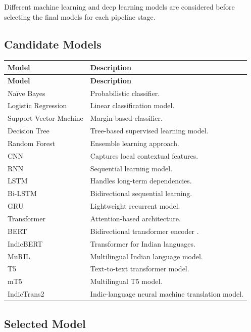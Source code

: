 Different machine learning and deep learning models are considered before selecting the final models for each pipeline stage.

\subsection{Candidate Models}

\begin{longtable}{|p{5cm}|p{8cm}|}
\hline
\textbf{Model} & \textbf{Description} \\
\hline
\endfirsthead
\hline
\textbf{Model} & \textbf{Description} \\
\hline
\endhead
Na\"ive Bayes & Probabilistic classifier.\\
\hline
Logistic Regression & Linear classification model.\\
\hline
Support Vector Machine & Margin-based classifier.\\
\hline
Decision Tree & Tree-based supervised learning model.\\
\hline
Random Forest & Ensemble learning approach.\\
\hline
CNN & Captures local contextual features.\\
\hline
RNN & Sequential learning model.\\
\hline
LSTM & Handles long-term dependencies.\\
\hline
Bi-LSTM & Bidirectional sequential learning.\\
\hline
GRU & Lightweight recurrent model.\\
\hline
Transformer & Attention-based architecture.\\
\hline
BERT & Bidirectional transformer encoder \cite{devlin2019bert}.\\
\hline
IndicBERT & Transformer for Indian languages.\\
\hline
MuRIL & Multilingual Indian language model.\\
\hline
T5 & Text-to-text transformer model.\\
\hline
mT5 & Multilingual T5 model.\\
\hline
IndicTrans2 & Indic-language neural machine translation model.\\
\hline
\end{longtable}

\subsection{Selected Model}

